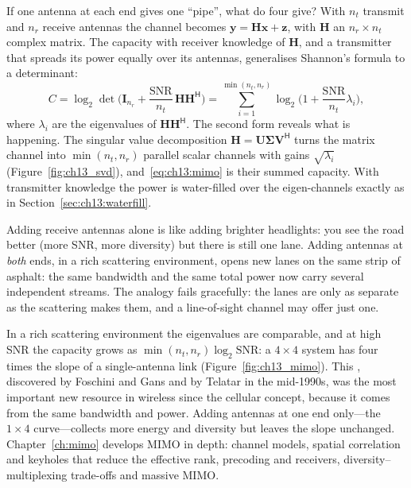 If one antenna at each end gives one ``pipe'', what do four give? With $n_t$ transmit and $n_r$
receive antennas the channel becomes $\mathbf{y}=\mathbf{H}\mathbf{x}+\mathbf{z}$, with $\mathbf{H}$
an $n_r\times n_t$ complex matrix. The capacity with receiver knowledge of $\mathbf{H}$, and a
transmitter that spreads its power equally over its antennas, generalises Shannon's formula to a
determinant:
\begin{equation}
C=\log_2\det\!\Big(\mathbf{I}_{n_r}+\frac{\mathrm{SNR}}{n_t}\,\mathbf{H}\mathbf{H}^{\mathsf H}\Big)
=\sum_{i=1}^{\min(n_t,n_r)}\log_2\!\Big(1+\frac{\mathrm{SNR}}{n_t}\lambda_i\Big),
\label{eq:ch13:mimo}
\end{equation}
where $\lambda_i$ are the eigenvalues of $\mathbf{H}\mathbf{H}^{\mathsf H}$. The second form reveals
what is happening. The singular value decomposition $\mathbf{H}=\mathbf{U}\boldsymbol{\Sigma}\mathbf{V}^{\mathsf H}$
turns the matrix channel into $\min(n_t,n_r)$ parallel scalar channels with gains $\sqrt{\lambda_i}$
(Figure~\ref{fig:ch13_svd}),
and~\eqref{eq:ch13:mimo} is their summed capacity. With transmitter knowledge the power is
water-filled over the eigen-channels exactly as in Section~\ref{sec:ch13:waterfill}.

\begin{analogy}
Adding receive antennas alone is like adding brighter headlights: you see the road better (more
SNR, more diversity) but there is still one lane. Adding antennas at \emph{both} ends, in a rich
scattering environment, opens new lanes on the same strip of asphalt: the same bandwidth and the
same total power now carry several independent streams. The analogy fails gracefully: the lanes are
only as separate as the scattering makes them, and a line-of-sight channel may offer just one.
\end{analogy}


In a rich scattering environment the eigenvalues are comparable, and at high SNR the capacity grows
as $\min(n_t,n_r)\log_2\mathrm{SNR}$: a $4\times4$ system has four times the slope of a
single-antenna link (Figure~\ref{fig:ch13_mimo}). This , discovered
by Foschini and Gans and by Telatar in the mid-1990s, was the most important new resource in
wireless since the cellular concept, because it comes from the same bandwidth and power. Adding
antennas at one end only---the $1\times4$ curve---collects more energy and diversity but
leaves the slope unchanged. Chapter~\ref{ch:mimo} develops MIMO in depth: channel models, spatial
correlation and keyholes that reduce the effective rank, precoding and receivers, diversity--multiplexing
trade-offs and massive MIMO.

